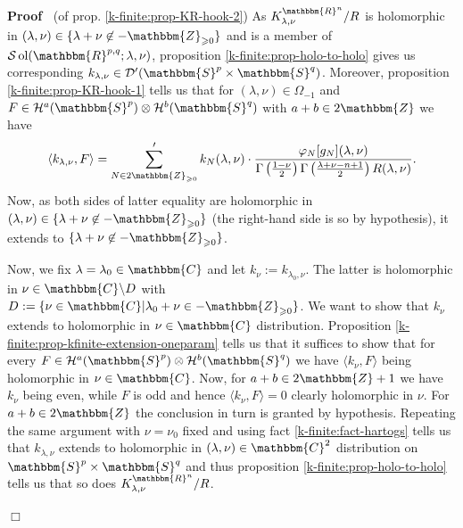 \documentclass{article}
\newcommand{\assign}{:=}
\newcommand{\nin}{\not\in}
\newcommand{\tmop}[1]{\ensuremath{\operatorname{#1}}}
\newenvironment{proof}{\noindent\textbf{Proof\ }}{\hspace*{\fill}$\Box$\medskip}
\numberwithin{definition}{section}
\numberwithin{lemma}{section}
\numberwithin{proposition}{section}
{\theorembodyfont{\rmfamily}\newtheorem{remark}{Remark}
\numberwithin{remark}{section}
}
\begin{document}
\begin{proof}
  (of prop. \ref{k-finite:prop-KR-hook-2}) As $K_{\lambda,
  \nu}^{\mathbbm{R}^n} / R$ is holomorphic in $( \lambda, \nu) \in \{ \lambda
  + \nu \nin -\mathbbm{Z}_{\geqslant 0} \}$ and is a member of $\mathcal{S}
  \tmop{ol} ( \mathbbm{R}^{p, q} ; \lambda, \nu)$, proposition
  \ref{k-finite:prop-holo-to-holo} gives us corresponding $k_{\lambda, \nu}
  \in \mathcal{D}' ( \mathbbm{S}^p \times \mathbbm{S}^q)$. Moreover,
  proposition \ref{k-finite:prop-KR-hook-1} tells us that for $( \lambda, \nu)
  \in \Omega_{- 1}$ and $F \in \mathcal{H}^a ( \mathbbm{S}^p) \otimes
  \mathcal{H}^b ( \mathbbm{S}^q)$ with $a + b \in 2\mathbbm{Z}$ we have
  \[ \langle k_{\lambda, \nu}, F \rangle = \sum'_{N \in
     2\mathbbm{Z}_{\geqslant 0}} k_N ( \lambda, \nu) \cdot \frac{\varphi_N
     [ g_N] ( \lambda, \nu)}{\Gamma \left( \frac{1 - \nu}{2} \right) \Gamma
     \left( \frac{\lambda + \nu - n + 1}{2} \right) R ( \lambda, \nu)} . \]
  Now, as both sides of latter equality are holomorphic in $( \lambda, \nu)
  \in \{ \lambda + \nu \nin -\mathbbm{Z}_{\geqslant 0} \}$ (the right-hand
  side is so by hypothesis), it extends to $\{ \lambda + \nu \nin
  -\mathbbm{Z}_{\geqslant 0} \}$.
  
  Now, we fix $\lambda = \lambda_0 \in \mathbbm{C}$ and let $k_{\nu} \assign
  k_{\lambda_0, \nu}$. The latter is holomorphic in $\nu \in
  \mathbbm{C}\backslash D_{}$ with $D_{} \assign \{ \nu \in \mathbbm{C} |
  \lambda_0 + \nu \in -\mathbbm{Z}_{\geqslant 0} \}$. We want to show that
  $k_{\nu}$ extends to holomorphic in $\nu \in \mathbbm{C}$ distribution.
  Proposition \ref{k-finite:prop-kfinite-extension-oneparam} tells us that it
  suffices to show that for every $F \in \mathcal{H}^a ( \mathbbm{S}^p)
  \otimes \mathcal{H}^b ( \mathbbm{S}^q)$ we have $\langle k_{\nu}, F \rangle$
  being holomorphic in $\nu \in \mathbbm{C}$. Now, for $a + b \in
  2\mathbbm{Z}+ 1$ we have $k_{\nu}$ being even, while $F$ is odd and hence
  $\langle k_{\nu}, F \rangle = 0$ clearly holomorphic in $\nu$. For $a + b
  \in 2\mathbbm{Z}$ the conclusion in turn is granted by hypothesis. Repeating
  the same argument with $\nu = \nu_0$ fixed and using fact
  \ref{k-finite:fact-hartogs} tells us that $k_{\lambda, \nu}$ extends to
  holomorphic in $( \lambda, \nu) \in \mathbbm{C}^2$ distribution on
  $\mathbbm{S}^p \times \mathbbm{S}^q$ and thus proposition
  \ref{k-finite:prop-holo-to-holo} tells us that so does $K_{\lambda,
  \nu}^{\mathbbm{R}^n} / R$.
  

\end{proof}
\end{document}
